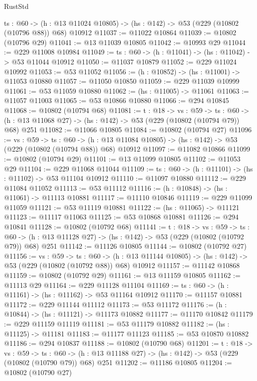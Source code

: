 \begin{lexlean}{RustStd}
\begin{coremodule}
  {ts : @60} ->
  (h : @13 @11024 @10805) -> (hs : @142) -> @53 (@229 (@10802 (@10796 @88)) @68) @10912
@11037 := @11022 @10864
@11039 := @10802 (@10796 @29)
@11041 := @13 @11039 @10805
@11042 := @10993 @29
@11044 := @229 @11008 @10984
@11049 := {ts : @60} -> (h : @11041) -> (hs : @11042) -> @53 @11044 @10912
@11050 := @11037 @10879
@11052 := @229 @11024 @10992
@11053 := @53 @11052
@11056 := (h : @10852) -> (hs : @11001) -> @11053 @10880
@11057 := @11050 @10850
@11059 := @229 @11039 @10999
@11061 := @53 @11059 @10880
@11062 := (hs : @11005) -> @11061
@11063 := @11057 @11003
@11065 := @53 @10866 @10880
@11066 := @294 @10845
@11068 := @10802 (@10794 @68)
@11081 := {t : @18} ->
  {vs : @59} ->
  {ts : @60} -> (h : @13 @11068 @27) -> (hs : @142) -> @53 (@229 (@10802 (@10794 @79)) @68) @251
@11082 := @11066 @10805
@11084 := @10802 (@10794 @27)
@11096 := {vs : @59} ->
  {ts : @60} ->
  (h : @13 @11084 @10805) -> (hs : @142) -> @53 (@229 (@10802 (@10794 @88)) @68) @10912
@11097 := @11082 @10866
@11099 := @10802 (@10794 @29)
@11101 := @13 @11099 @10805
@11102 := @11053 @29
@11104 := @229 @11068 @11044
@11109 := {ts : @60} -> (h : @11101) -> (hs : @11102) -> @53 @11104 @10912
@11110 := @11097 @10880
@11112 := @229 @11084 @11052
@11113 := @53 @11112
@11116 := (h : @10848) -> (hs : @11061) -> @11113 @10881
@11117 := @11110 @10846
@11119 := @229 @11099 @11059
@11121 := @53 @11119 @10881
@11122 := (hs : @11065) -> @11121
@11123 := @11117 @11063
@11125 := @53 @10868 @10881
@11126 := @294 @10841
@11128 := @10802 (@10792 @68)
@11141 := {t : @18} ->
  {vs : @59} ->
  {ts : @60} -> (h : @13 @11128 @27) -> (hs : @142) -> @53 (@229 (@10802 (@10792 @79)) @68) @251
@11142 := @11126 @10805
@11144 := @10802 (@10792 @27)
@11156 := {vs : @59} ->
  {ts : @60} ->
  (h : @13 @11144 @10805) -> (hs : @142) -> @53 (@229 (@10802 (@10792 @88)) @68) @10912
@11157 := @11142 @10868
@11159 := @10802 (@10792 @29)
@11161 := @13 @11159 @10805
@11162 := @11113 @29
@11164 := @229 @11128 @11104
@11169 := {ts : @60} -> (h : @11161) -> (hs : @11162) -> @53 @11164 @10912
@11170 := @11157 @10881
@11172 := @229 @11144 @11112
@11173 := @53 @11172
@11176 := (h : @10844) -> (hs : @11121) -> @11173 @10882
@11177 := @11170 @10842
@11179 := @229 @11159 @11119
@11181 := @53 @11179 @10882
@11182 := (hs : @11125) -> @11181
@11183 := @11177 @11123
@11185 := @53 @10870 @10882
@11186 := @294 @10837
@11188 := @10802 (@10790 @68)
@11201 := {t : @18} ->
  {vs : @59} ->
  {ts : @60} -> (h : @13 @11188 @27) -> (hs : @142) -> @53 (@229 (@10802 (@10790 @79)) @68) @251
@11202 := @11186 @10805
@11204 := @10802 (@10790 @27)

\end{coremodule}
\end{lexlean}
